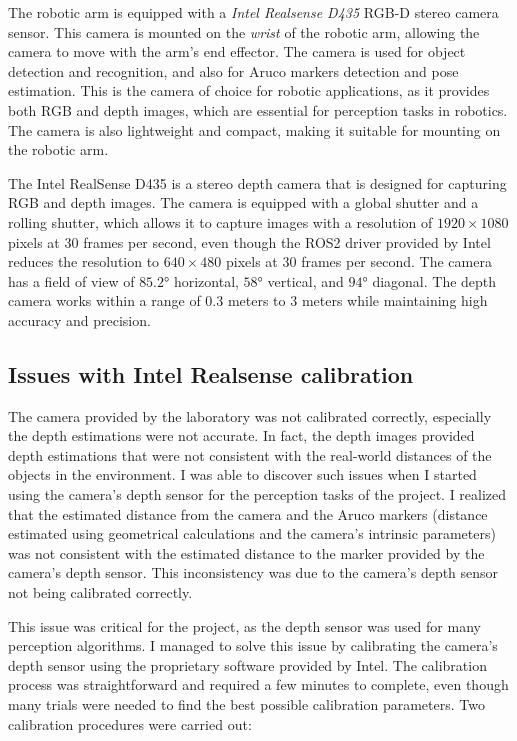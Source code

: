 The robotic arm is equipped with a \textit{Intel Realsense D435} RGB-D stereo camera sensor.
This camera is mounted on the \textit{wrist} of the robotic arm, allowing the camera to move with the arm's end effector.
The camera is used for object detection and recognition, and also for Aruco markers detection and pose estimation.
This is the camera of choice for robotic applications, as it provides both RGB and depth images, which are essential
for perception tasks in robotics. The camera is also lightweight and compact, making it suitable for mounting on the robotic arm.

The Intel RealSense D435 is a stereo depth camera that is designed for capturing RGB and depth images.
The camera is equipped with a global shutter and a rolling shutter, which allows it to capture images with a resolution
of $1920\times1080$ pixels at $30$ frames per second, even though the ROS2 driver provided by Intel reduces the resolution
to $640\times480$ pixels at $30$ frames per second. The camera has a field of view of $85.2$° horizontal, $58$° vertical,
and $94$° diagonal. The depth camera works within a range of $0.3$ meters to $3$ meters while maintaining 
high accuracy and precision. 

\subsection*{Issues with Intel Realsense calibration}

The camera provided by the laboratory was not calibrated correctly, especially the depth estimations were not accurate.
In fact, the depth images provided depth estimations that were not consistent with the real-world distances of the objects
in the environment. I was able to discover such issues when I started using the camera's depth sensor for the perception
tasks of the project. I realized that the estimated distance from the camera and the Aruco markers (distance estimated
using geometrical calculations and the camera's intrinsic parameters) was not consistent with the estimated distance
to the marker provided by the camera's depth sensor. This inconsistency was due to the camera's depth sensor not being
calibrated correctly.

This issue was critical for the project, as the depth sensor was used for many perception algorithms.
I managed to solve this issue by calibrating the camera's depth sensor using the proprietary software provided by Intel.
The calibration process was straightforward and required a few minutes to complete, even though many trials were needed
to find the best possible calibration parameters. Two calibration procedures were carried out:

